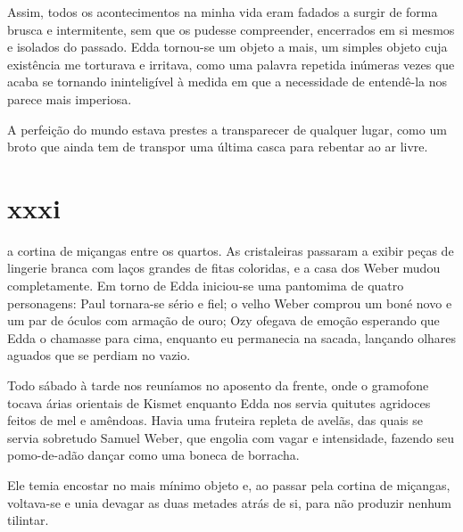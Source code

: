 Assim, todos os acontecimentos na minha vida eram fadados a surgir de forma
brusca e intermitente, sem que os pudesse compreender, encerrados em si
mesmos e isolados do passado. Edda tornou-se um objeto a mais, um simples
objeto cuja existência me torturava e irritava, como uma palavra repetida
inúmeras vezes que acaba se tornando ininteligível à medida em que a
necessidade de entendê-la nos parece mais imperiosa.

A perfeição do mundo estava prestes a transparecer de qualquer lugar, como um
broto que ainda tem de transpor uma última casca para rebentar ao ar livre.




\section{xxxi} 

 a cortina de miçangas entre os quartos. As cristaleiras
 passaram a exibir peças de lingerie branca com laços grandes de fitas
 coloridas, e a casa dos Weber mudou completamente. Em torno de Edda
 iniciou-se uma pantomima de quatro personagens: Paul tornara-se sério e
 fiel; o velho Weber comprou um boné novo e um par de óculos com armação de
 ouro; Ozy ofegava de emoção esperando que Edda o chamasse para cima,
 enquanto eu permanecia na sacada, lançando olhares aguados que se perdiam no
 vazio.

Todo sábado à tarde nos reuníamos no aposento da frente, onde o gramofone
tocava árias orientais de Kismet enquanto Edda nos servia quitutes agridoces
feitos de mel e amêndoas. Havia uma fruteira repleta de avelãs, das quais se
servia sobretudo Samuel Weber, que engolia com vagar e intensidade, fazendo
seu pomo-de-adão dançar como uma boneca de borracha.


Ele temia encostar no mais mínimo objeto e, ao passar pela cortina de
miçangas, voltava-se e unia devagar as duas metades atrás de si, para não
produzir nenhum tilintar.

